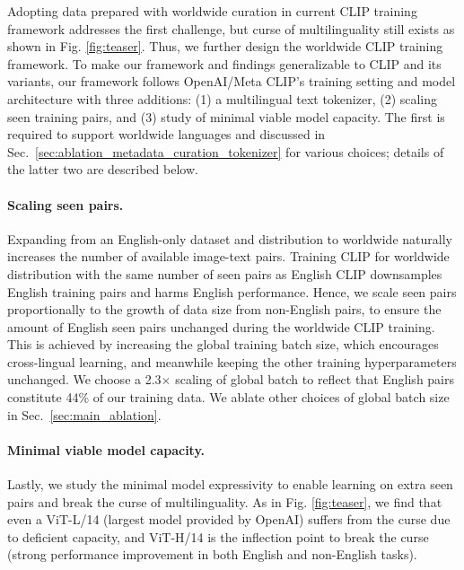 Adopting data prepared with worldwide curation in current CLIP training framework addresses the first challenge, but curse of multilinguality still exists as shown in Fig. \ref{fig:teaser}.
Thus, we further design the worldwide CLIP training framework.
To make our framework and findings generalizable to CLIP and its variants, our framework follows OpenAI/Meta CLIP's training setting and model architecture with three additions: (1) a multilingual text tokenizer, (2) scaling seen training pairs, and (3) 
study of minimal viable model capacity.
The first is required to support worldwide languages and discussed in Sec.~\ref{sec:ablation_metadata_curation_tokenizer} for various choices; details of the latter two are described below.

\paragraph{Scaling seen pairs.}
Expanding from an English-only dataset and distribution to worldwide naturally increases the number of available image-text pairs. Training CLIP for worldwide distribution with the same number of seen pairs as English CLIP downsamples English training pairs and harms English performance. Hence, we scale seen pairs proportionally to the growth of data size from non-English pairs, to ensure the amount of English seen pairs unchanged during the worldwide CLIP training. This is achieved by increasing the global training batch size, which encourages cross-lingual learning, and meanwhile keeping the other training hyperparameters unchanged. 
We choose a 2.3$\times$ scaling of global batch to reflect that English pairs constitute 44\% of our training data. We ablate other choices of global batch size in Sec.~\ref{sec:main_ablation}.

\paragraph{Minimal viable model capacity.}  
Lastly, we study the minimal model expressivity to enable learning on extra seen pairs and break the curse of multilinguality. As in Fig. \ref{fig:teaser}, we find that even a ViT-L/14 (largest model provided by OpenAI) suffers from the curse due to deficient capacity, and
ViT-H/14 is the inflection point to break the curse (strong performance improvement in both English and non-English tasks).
